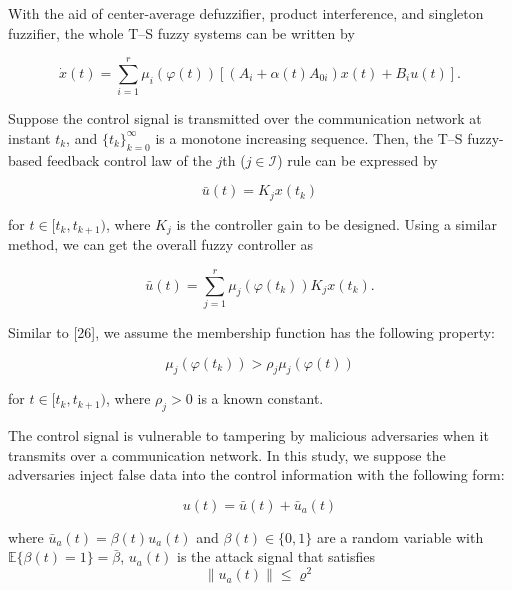 \documentclass{article}
\begin{document}
With the aid of center-average defuzzifier, product interference, and singleton fuzzifier, the whole T--S fuzzy systems can be written by

\begin{equation}
\dot{x}(t) = \sum_{i=1}^{r} \mu_i(\varphi(t))[(A_i + \alpha(t)A_{0i})x(t) + B_i u(t)]. 
\end{equation}


Suppose the control signal is transmitted over the communication network at instant $t_k$, and $\{t_k\}_{k=0}^{\infty}$ is a monotone increasing sequence. Then, the T--S fuzzy-based feedback control law of the $j$th ($j \in \mathcal{I}$) rule can be expressed by


\begin{equation}
\bar{u}(t) = K_j x(t_k)
\end{equation}

for $t \in [t_k, t_{k+1})$, where $K_j$ is the controller gain to be designed. Using a similar method, we can get the overall fuzzy controller as

\begin{equation}
\bar{u}(t) = \sum_{j=1}^{r} \mu_j(\varphi(t_k)) K_j x(t_k). 
\end{equation}

Similar to [26], we assume the membership function has the following property:

\begin{equation}
\mu_j(\varphi(t_k)) > \rho_j \mu_j(\varphi(t))
\end{equation}

for $t \in [t_k, t_{k+1})$, where $\rho_j > 0$ is a known constant.

The control signal is vulnerable to tampering by malicious adversaries when it transmits over a communication network. In this study, we suppose the adversaries inject false data into the control information with the following form:

\begin{equation}
u(t) = \bar{u}(t) + \bar{u}_a(t)
\end{equation}

where $\bar{u}_a(t) = \beta(t) u_a(t)$ and $\beta(t) \in \{0, 1\}$ are a random variable with $\mathbb{E}\{\beta(t) = 1\} = \bar{\beta}$, $u_a(t)$ is the attack signal that satisfies
\begin{equation}
\|u_a(t)\| \leq \varrho^2
\end{equation}
\end{document}
